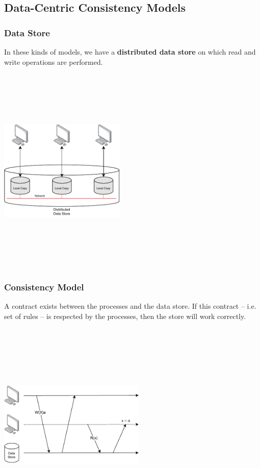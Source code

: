 \documentclass{article}
\begin{document}
\subsection{Data-Centric Consistency Models}
\subsubsection{Data Store}
In these kinds of models, we have a \textbf{distributed data store} on which read and write operations are performed.
\begin{center}
	\includegraphics[width=6cm, height=10cm, keepaspectratio]{assets/data-store.pdf}
\end{center}

\subsubsection{Consistency Model}
A contract exists between the processes and the data store. If this contract -- i.e. set of rules -- is respected by the processes, then the store will work correctly.
\begin{center}
	\includegraphics[width=7cm, height=10cm, keepaspectratio]{assets/consistency.pdf}
\end{center}
\end{document}
